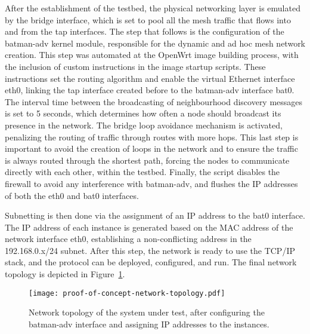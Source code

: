 After the establishment of the testbed, the physical networking layer is emulated by the bridge interface, which is set to pool all the mesh traffic that flows into and from the tap interfaces. The step that follows is the configuration of the batman-adv kernel module, responsible for the dynamic and ad hoc mesh network creation. This step was automated at the OpenWrt image building process, with the inclusion of custom instructions in the image startup scripts. These instructions set the routing algorithm and enable the virtual Ethernet interface eth0, linking the tap interface created before to the batman-adv interface bat0. The interval time between the broadcasting of neighbourhood discovery messages is set to 5 seconds, which determines how often a node should broadcast its presence in the network. The bridge loop avoidance mechanism is activated, penalizing the routing of traffic through routes with more hops. This last step is important to avoid the creation of loops in the network and to ensure the traffic is always routed through the shortest path, forcing the nodes to communicate directly with each other, within the testbed. Finally, the script disables the firewall to avoid any interference with batman-adv, and flushes the IP addresses of both the eth0 and bat0 interfaces.

Subnetting is then done via the assignment of an IP address to the bat0 interface. The IP address of each instance is generated based on the MAC address of the network interface eth0, establishing a non-conflicting address in the 192.168.0.x/24 subnet. After this step, the network is ready to use the TCP/IP stack, and the \pol{} protocol can be deployed, configured, and run. The final network topology is depicted in Figure~\ref{fig:infrastructure:network-architecture}.

\begin{figure}[h!]
    \begin{center}
    \texttt{[image: proof-of-concept-network-topology.pdf]}
    \caption{Network topology of the system under test, after configuring the batman-adv interface and assigning IP addresses to the instances.}
    \label{fig:infrastructure:network-architecture}
    \end{center}
\end{figure}